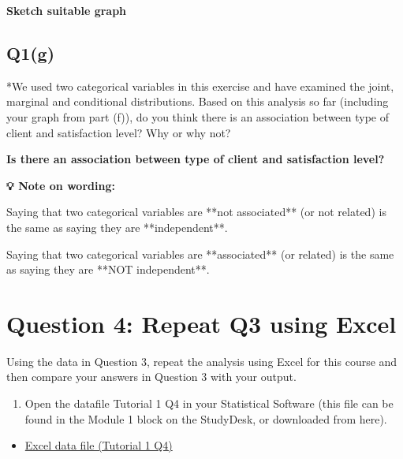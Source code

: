 \documentclass[
  11pt,
  oneside]{scrbook}
\providecommand{\tightlist}{%
  \setlength{\itemsep}{0pt}\setlength{\parskip}{0pt}}
\begin{document}
\textbf{Sketch suitable graph}

\begin{answerbox}\vspace{5cm}\end{answerbox}

\subsection*{Q1(g)}\label{q1g}

*We used two categorical variables in this exercise and have examined the joint, marginal and conditional distributions. Based on this analysis so far (including your graph from part (f)), do you think there is an association between type of client and satisfaction level? Why or why not?

\textbf{Is there an association between type of client and satisfaction level?}

\begin{answerbox}\vspace{5cm}\end{answerbox}

\begin{tipbox}
\textbf{💡 Note on wording:}

Saying that two categorical variables are **not associated** (or not related) is the same as saying they are **independent**.

Saying that two categorical variables are **associated** (or related) is the same as
saying they are **NOT independent**.
\end{tipbox}

\section{Question 4: Repeat Q3 using Excel}\label{question-4-repeat-q3-using-excel}

Using the data in Question 3, repeat the analysis using Excel for this course and then compare your answers in Question 3 with your output.

\begin{enumerate}
\def\labelenumi{(\alph{enumi})}
\tightlist
\item
  Open the datafile Tutorial 1 Q4 in your Statistical Software (this file can be found in the Module 1 block on the StudyDesk, or downloaded from here).
\end{enumerate}

\begin{itemize}
\tightlist
\item
  \href{static/Tutorial\%201\%20Q4\%20data.xlsx}{Excel data file (Tutorial 1 Q4)}
\end{itemize}
\end{document}
